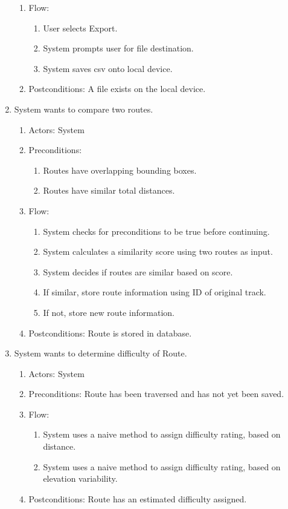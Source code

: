 ﻿\documentclass{article}
\begin{document}
\begin{enumerate}
\begin{enumerate}
        \item Flow:
            \begin{enumerate}
            \item User selects Export.
            \item System prompts user for file destination.
            \item System saves csv onto local device.
            \end{enumerate}
        \item Postconditions: A file exists on the local device.
    \end{enumerate}
\item System wants to compare two routes.
    \begin{enumerate}
        \item Actors: System
        \item Preconditions:
            \begin{enumerate}
            \item Routes have overlapping bounding boxes.
            \item Routes have similar total distances.
            \end{enumerate}
        \item Flow:
            \begin{enumerate}
            \item System checks for preconditions to be true before continuing.
            \item System calculates a similarity score using two routes as input.
            \item System decides if routes are similar based on score.
            \item If similar, store route information using ID of original track.
            \item If not, store new route information.
            \end{enumerate}
        \item Postconditions: Route is stored in database.
    \end{enumerate}
\item System wants to determine difficulty of Route.
    \begin{enumerate}
        \item Actors: System
        \item Preconditions: Route has been traversed and has not yet been saved.
        \item Flow:
            \begin{enumerate}
            \item System uses a naive method to assign difficulty rating, based on distance.
            \item System uses a naive method to assign difficulty rating, based on elevation variability.
            \end{enumerate}
        \item Postconditions: Route has an estimated difficulty assigned.
    \end{enumerate}
\end{enumerate}
\end{document}
